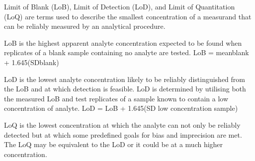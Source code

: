 \item	Limit of Blank (LoB), Limit of Detection (LoD), and Limit of Quantitation (LoQ) are terms used to describe the smallest concentration of a measurand that can be reliably measured by an analytical procedure.
\item		LoB is the highest apparent analyte concentration expected to be found when replicates of a blank sample containing no analyte are tested.
LoB = meanblank + 1.645(SDblank)
\item		LoD is the lowest analyte concentration likely to be reliably distinguished from the LoB and at which detection is feasible. LoD is determined by utilising both the measured LoB and test replicates of a sample known to contain a low concentration of analyte.
LoD = LoB + 1.645(SD low concentration sample)
\item		LoQ is the lowest concentration at which the analyte can not only be reliably detected but at which some predefined goals for bias and imprecision are met. The LoQ may be equivalent to the LoD or it could be at a much higher concentration.
